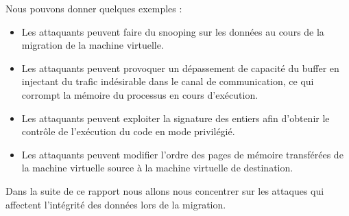 Nous pouvons donner quelques exemples :

\begin{itemize}
    \item Les attaquants peuvent faire du snooping sur les données au cours de la migration de la machine virtuelle.  

    \item Les attaquants peuvent provoquer un dépassement de capacité du buffer en injectant du trafic indésirable dans le canal de communication, ce qui corrompt la mémoire du processus en cours d'exécution.
    
    \item Les attaquants peuvent exploiter la signature des entiers afin d'obtenir le contrôle de l'exécution du code en mode privilégié.
    
    \item Les attaquants peuvent modifier l'ordre des pages de mémoire transférées de la machine virtuelle source à la machine virtuelle de destination.   
\end{itemize}

Dans la suite de ce rapport nous allons nous concentrer sur les attaques qui affectent l'intégrité des données lors de la migration.

